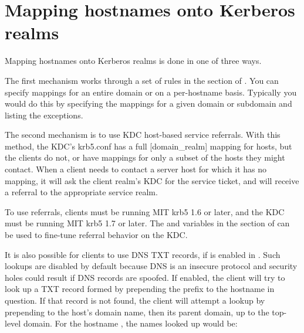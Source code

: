 \documentclass[letterpaper,10pt,english]{sphinxmanual}
\begin{document}
\section{Mapping hostnames onto Kerberos realms}
\label{\detokenize{admin/realm_config:mapping-hostnames-onto-kerberos-realms}}\label{\detokenize{admin/realm_config:mapping-hostnames}}
Mapping hostnames onto Kerberos realms is done in one of three ways.

The first mechanism works through a set of rules in the
{\hyperref[\detokenize{admin/conf_files/krb5_conf:domain-realm}]{}} section of {\hyperref[\detokenize{admin/conf_files/krb5_conf:krb5-conf-5}]{}}.  You can specify
mappings for an entire domain or on a per-hostname basis.  Typically
you would do this by specifying the mappings for a given domain or
subdomain and listing the exceptions.

The second mechanism is to use KDC host-based service referrals.  With
this method, the KDC’s krb5.conf has a full {[}domain\_realm{]} mapping for
hosts, but the clients do not, or have mappings for only a subset of
the hosts they might contact.  When a client needs to contact a server
host for which it has no mapping, it will ask the client realm’s KDC
for the service ticket, and will receive a referral to the appropriate
service realm.

To use referrals, clients must be running MIT krb5 1.6 or later, and
the KDC must be running MIT krb5 1.7 or later.  The
 and  variables in the
{\hyperref[\detokenize{admin/conf_files/kdc_conf:kdc-realms}]{}} section of {\hyperref[\detokenize{admin/conf_files/kdc_conf:kdc-conf-5}]{}} can be used to
fine-tune referral behavior on the KDC.

It is also possible for clients to use DNS TXT records, if
 is enabled in {\hyperref[\detokenize{admin/conf_files/krb5_conf:krb5-conf-5}]{}}.  Such lookups
are disabled by default because DNS is an insecure protocol and security
holes could result if DNS records are spoofed.  If enabled, the client
will try to look up a TXT record formed by prepending the prefix
 to the hostname in question.  If that record is not
found, the client will attempt a lookup by prepending  to the
host’s domain name, then its parent domain, up to the top-level domain.
For the hostname , the names looked up
would be:
\end{document}
